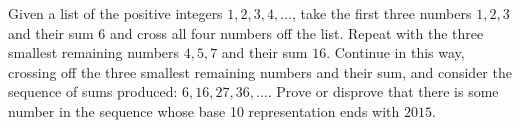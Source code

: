 Given a list of the positive integers $1,2,3,4,\dots$, take the first three numbers
$1,2,3$ and their sum $6$ and cross all four numbers off the list. Repeat with the three 
smallest remaining numbers $4,5,7$ and their sum $16$. Continue in this way, crossing off the three smallest remaining numbers and their sum, and consider the sequence of sums produced: $6, 16, 27, 36, \dots$. Prove or disprove that there is some number in the sequence whose base 10 representation ends with $2015$.

